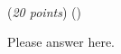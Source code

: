 \documentclass{template}
\begin{document}
\newpage

\begin{problem}
~\newline
~\newline


\begin{subproblem}
(\textit{20 points}) (\scoretextemoji{}\scorecodeemoji{})


\end{subproblem}

\begin{solution}
Please answer here.
\end{solution}
\end{problem}
\end{document}
